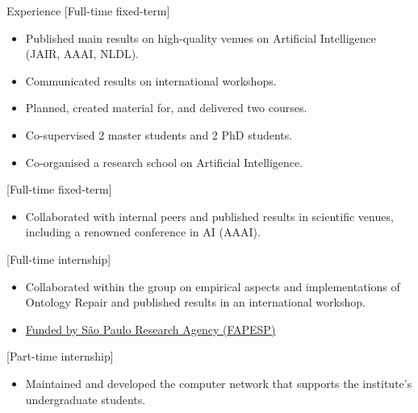 %

\begin{rSection}{Experience}
    [Full-time fixed-term]{%
        \begin{itemize}
            \item Published main results on high-quality venues on Artificial Intelligence (JAIR, AAAI, NLDL).
            \item Communicated results on international workshops.
            \item Planned, created material for, and delivered two courses.
            \item Co-supervised 2 master students and 2 PhD students.
            \item Co-organised a research school on Artificial Intelligence.
        \end{itemize}%
    }

    [Full-time fixed-term]{%
        \begin{itemize}
            \item Collaborated with internal peers and published results in scientific venues, including a renowned conference in AI (AAAI).
        \end{itemize}%
    }

    [Full-time internship]{%
        \begin{itemize}
            \item Collaborated within the group on empirical aspects and implementations of Ontology Repair and published results in an international workshop.
            \item \href{https://bv.fapesp.br/en/bolsas/176114/improving-efficiency-of-belief-base-change-in-description-logics-with-modularity-in-ontologies/}{Funded by São Paulo Research Agency ({FAPESP})}
        \end{itemize}%
    }

    [Part-time internship]{%
        \begin{itemize}
            \item Maintained and developed the computer network that supports the institute's undergraduate students.
        \end{itemize}%
    }
\end{rSection}
